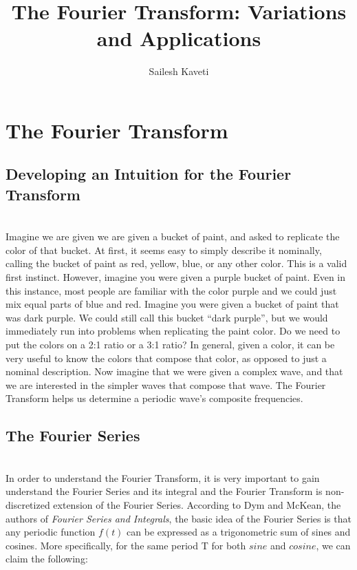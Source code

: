 \documentclass{amsproc}
\title{The Fourier Transform: Variations and Applications}
\author{Sailesh Kaveti}
\begin{document}
\maketitle

\section{The Fourier Transform}

\subsection{Developing an Intuition for the Fourier Transform}

\mbox{}	\\
\indent Imagine we are given we are given a bucket of paint, and asked to replicate the color of that bucket. At first, it seems easy to simply describe it nominally, calling the bucket of paint as red, yellow, blue, or any other color.  This is a valid first instinct. However, imagine you were given a purple bucket of paint. Even in this instance, most people are familiar with the color purple and we could just mix equal parts of blue and red. Imagine you were given a bucket of paint that was dark purple. We could still call this bucket “dark purple”, but we would immediately run into problems when replicating the paint color. Do we need to put the colors on a 2:1 ratio or a 3:1 ratio? In general, given a color, it can be very useful to know the colors that compose that color, as opposed to just a nominal description. Now imagine that we were given a complex wave, and that we are interested in the simpler waves that compose that wave. The Fourier Transform helps us determine a periodic wave's composite frequencies.

\subsection{The Fourier Series}

\mbox{}	\\
\indent In order to understand the Fourier Transform, it is very important to gain understand the Fourier Series and its integral and the Fourier Transform is non-discretized extension of the Fourier Series. According to Dym and McKean, the authors of \textit{Fourier Series and Integrals}, the basic idea of the Fourier Series is that any periodic function $f(t)$ can be expressed as a trigonometric sum of sines and cosines. More specifically, for the same period T for both $sine$ and $cosine$, we can claim the following:
\end{document}
